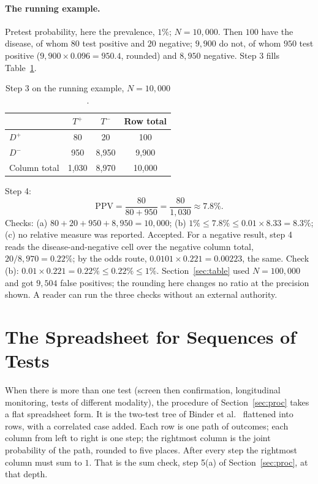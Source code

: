 \documentclass[11pt]{article}
\begin{document}
\paragraph{The running example.}
Pretest probability, here the prevalence, $1\%$; $N = 10{,}000$. Then $100$ have the disease, of whom $80$ test positive and $20$ negative; $9{,}900$ do not, of whom $950$ test positive ($9{,}900 \times 0.096 = 950.4$, rounded) and $8{,}950$ negative. Step 3 fills Table~\ref{tab:run}.

\begin{table}[H]
\centering
\begin{tabular}{l|cc|c}
\toprule
                  & $T^+$    & $T^-$    & Row total \\
\midrule
$D^+$          & \cellcolor{tpcol}80       & \cellcolor{fncol}20       & 100  \\
$D^-$          & \cellcolor{fpcol}950      & \cellcolor{tncol}8{,}950  & 9{,}900 \\
\midrule
Column total      & 1{,}030  & 8{,}970  & 10{,}000 \\
\bottomrule
\end{tabular}
\caption{Step 3 on the running example, $N = 10{,}000$.}
\label{tab:run}
\end{table}

Step 4:
\begin{equation*}
  \mathrm{PPV} = \frac{80}{80 + 950} = \frac{80}{1{,}030} \approx 7.8\%.
\end{equation*}
Checks: (a) $80 + 20 + 950 + 8{,}950 = 10{,}000$; (b) $1\% \leq 7.8\% \leq 0.01 \times 8.33 = 8.3\%$; (c) no relative measure was reported. Accepted. For a negative result, step 4 reads the disease-and-negative cell over the negative column total, $20 / 8{,}970 = 0.22\%$; by the odds route, $0.0101 \times 0.221 = 0.00223$, the same. Check (b): $0.01 \times 0.221 = 0.22\% \leq 0.22\% \leq 1\%$. Section~\ref{sec:table} used $N = 100{,}000$ and got $9{,}504$ false positives; the rounding here changes no ratio at the precision shown. A reader can run the three checks without an external authority.

\section{The Spreadsheet for Sequences of Tests}
\label{sec:sheet}

When there is more than one test (screen then confirmation, longitudinal monitoring, tests of different modality), the procedure of Section~\ref{sec:proc} takes a flat spreadsheet form. It is the two-test tree of Binder et al.\ \cite{binder2018} flattened into rows, with a correlated case added. Each row is one path of outcomes; each column from left to right is one step; the rightmost column is the joint probability of the path, rounded to five places. After every step the rightmost column must sum to $1$. That is the sum check, step 5(a) of Section~\ref{sec:proc}, at that depth.
\end{document}
